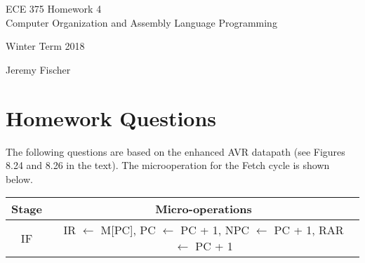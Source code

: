 \documentclass[12pt,letterpaper]{article}
\begin{document}
\begin{titlepage}
    \vspace*{4cm}
    \begin{flushright}
    {\huge
        ECE 375 Homework 4\\[1cm]
    }
    {\large
       Computer Organization and Assembly Language Programming
    }
    \end{flushright}
    \begin{flushleft}
    Winter Term 2018
    \end{flushleft}
    \begin{flushright}
    Jeremy Fischer

    \end{flushright}

\end{titlepage}


\section{Homework Questions}
	The following questions are based on the enhanced AVR datapath (see Figures 8.24 and 8.26 in the text). 
	The microoperation for the Fetch cycle is shown below.
	
	\begin{tabular}{ |c|c| } 
			\hline
			Stage & Micro-operations \\ \hline
			IF & IR $\leftarrow$ M[PC], PC $\leftarrow$ PC + 1, NPC $\leftarrow$ PC + 1, RAR $\leftarrow$ PC + 1  \\ \hline
	\end{tabular}
\end{document}
